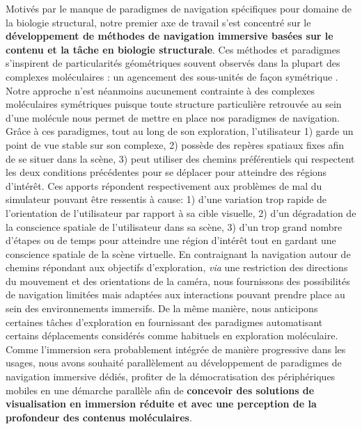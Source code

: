 Motivés par le manque de paradigmes de navigation spécifiques pour domaine de la biologie structural, notre premier axe de travail s'est concentré sur le \textbf{développement de méthodes de navigation immersive basées sur le contenu et la tâche en biologie structurale}. Ces méthodes et paradigmes s'inspirent de  particularités géométriques souvent observés dans la plupart des complexes moléculaires : un agencement des sous-unités de façon symétrique \cite{goodsell_structural_2000}. Notre approche n'est néanmoins aucunement contrainte à des complexes moléculaires symétriques puisque toute structure particulière retrouvée au sein d'une molécule nous permet de mettre en place nos paradigmes de navigation. Grâce à ces paradigmes, tout au long de son exploration, l'utilisateur 1) garde un point de vue stable sur son complexe, 2) possède des repères spatiaux fixes afin de se situer dans la scène, 3) peut utiliser des chemins préférentiels qui respectent les deux conditions précédentes pour se déplacer pour atteindre des régions d’intérêt. Ces apports répondent respectivement aux problèmes de mal du simulateur pouvant être ressentis à cause: 1) d'une variation trop rapide de l'orientation de l'utilisateur par rapport à sa cible visuelle, 2) d'un dégradation de la conscience spatiale de l'utilisateur dans sa scène, 3) d'un trop grand nombre d'étapes ou de temps pour atteindre une région d'intérêt tout en gardant une conscience spatiale de la scène virtuelle. En contraignant la navigation autour de chemins répondant aux objectifs d'exploration, \textit{via} une restriction des directions du mouvement et des orientations de la caméra, nous fournissons des possibilités de navigation limitées mais adaptées aux interactions pouvant prendre place au sein des environnements immersifs. De la même manière, nous anticipons certaines tâches d'exploration en fournissant des paradigmes automatisant certains déplacements considérés comme habituels en exploration moléculaire. Comme l'immersion sera probablement intégrée de manière progressive dans les usages, nous avons souhaité parallèlement au développement de paradigmes de navigation immersive dédiés, profiter de la démocratisation des périphériques mobiles en une démarche parallèle afin de \textbf{concevoir des solutions de visualisation en immersion réduite et avec une perception de la profondeur des contenus moléculaires}. 




